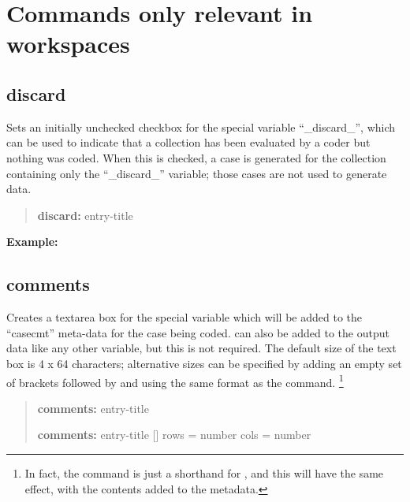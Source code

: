 \documentclass[letterpaper,10pt,english]{sphinxmanual}
\begin{document}
\section{Commands only relevant in workspaces}
\label{forms:commands-only-relevant-in-workspaces}

\subsection{discard}
\label{forms:discard}
Sets an initially unchecked checkbox for the special variable
“\_discard\_”, which can be used
to indicate that a collection has been evaluated by a coder but nothing
was coded. When this is checked, a case is generated for the collection
containing only the “\_discard\_” variable; those cases are not used to
generate data.
\begin{quote}

\begin{DUlineblock}{0em}
\item[] \textbf{discard:} entry-title
\end{DUlineblock}
\end{quote}

\textbf{Example:}
\begin{quote}

\end{quote}


\subsection{comments}
\label{forms:comments}
Creates a textarea box for the special variable  which will be
added to the “casecmt” meta-data for the case being coded. 
can also be added to the output data like any other variable, but this
is not required. The default size of the text box is 4 x 64 characters;
alternative sizes can be specified by adding an empty set of brackets
followed by  and  using the same format as the 
command. \footnote{
In fact, the  command is just a shorthand for
, and this will have the same
effect, with the contents added to the metadata.
}
\begin{quote}

\begin{DUlineblock}{0em}
\item[] \textbf{comments:} entry-title
\item[] \textbf{comments:} entry-title {[}{]} rows = number cols = number
\end{DUlineblock}
\end{quote}
\end{document}
